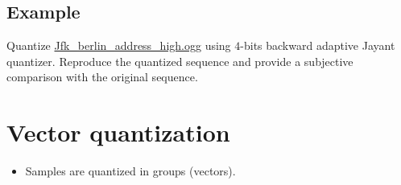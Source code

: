 \subsection{Example}
Quantize
\href{https://upload.wikimedia.org/wikipedia/commons/3/3a/Jfk_berlin_address_high.ogg}{Jfk\_berlin\_address\_high.ogg}
using \(4\)-bits backward adaptive Jayant quantizer. Reproduce the
quantized sequence and provide a subjective comparison with the original
sequence.

\section{Vector quantization}
\begin{itemize}
\item Samples are quantized in groups (vectors).
\end{itemize}
  


